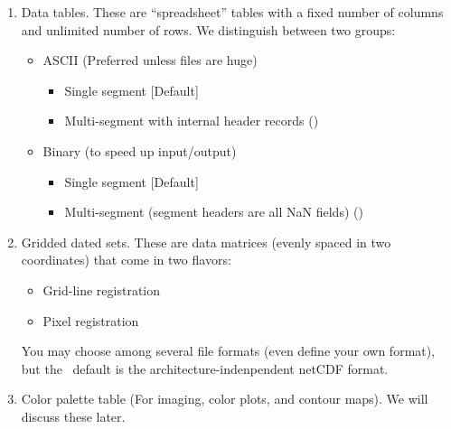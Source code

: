\documentclass{report}
\begin{document}
\begin{enumerate}

\item Data tables.
These are ``spreadsheet'' tables with a fixed number of columns and
unlimited number of rows.  We distinguish between two groups:

\begin{itemize}

\item ASCII (Preferred unless files are huge)

\begin{itemize}

\item Single segment [Default]

\item Multi-segment with internal header records ()
\end{itemize}

\item Binary (to speed up input/output)

\begin{itemize}

\item Single segment [Default]

\item Multi-segment (segment headers are all NaN fields) ()
\end{itemize}

\end{itemize}

\item Gridded dated sets.
These are data matrices (evenly spaced in two coordinates) that come
in two flavors:

\begin{itemize}

\item Grid-line registration

\item Pixel registration

\end{itemize}

You may choose among several file formats (even define your own format),
but the \GMT\ default is the architecture-indenpendent netCDF format.

\item Color palette table (For imaging, color plots, and contour maps).
We will discuss these later.

\end{enumerate}
\end{document}
